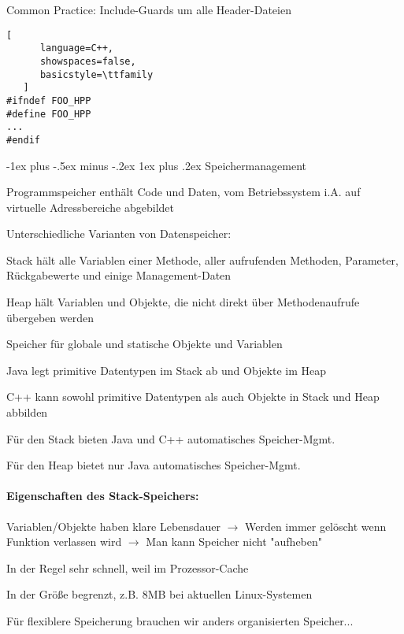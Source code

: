 \documentclass[10pt]{article}
\makeatletter
\renewcommand{\subsubsection}{\@startsection{subsubsection}{3}{0mm}%
                                {-1ex plus -.5ex minus -.2ex}%
                                {1ex plus .2ex}%
                                {\normalfont\small\bfseries}}
\makeatother
\begin{document}
\begin{itemize*}
Common Practice: Include-Guards um alle Header-Dateien
\begin{lstlisting}[
      language=C++,
      showspaces=false,
      basicstyle=\ttfamily
   ]
#ifndef FOO_HPP
#define FOO_HPP
...
#endif
\end{lstlisting}


\subsubsection{Speichermanagement}

\begin{itemize*}
  \item Programmspeicher enthält Code und Daten, vom Betriebssystem i.A. auf virtuelle Adressbereiche abgebildet
  \item Unterschiedliche Varianten von Datenspeicher:
  \begin{itemize*}
    \item Stack hält alle Variablen einer Methode, aller aufrufenden Methoden, Parameter, Rückgabewerte und einige Management-Daten
    \item Heap hält Variablen und Objekte, die nicht direkt über Methodenaufrufe übergeben werden
    \item Speicher für globale und statische Objekte und Variablen
  \end{itemize*}
  \item Java legt primitive Datentypen im Stack ab und Objekte im Heap
  \item C++ kann sowohl primitive Datentypen als auch Objekte in Stack und Heap abbilden
  \item Für den Stack bieten Java und C++ automatisches Speicher-Mgmt.
  \item Für den Heap bietet nur Java automatisches Speicher-Mgmt.
\end{itemize*}

\paragraph{Eigenschaften des Stack-Speichers:}
\begin{itemize*}
  \item Variablen/Objekte haben klare Lebensdauer $\rightarrow$ Werden immer gelöscht wenn Funktion verlassen wird  $\rightarrow$ Man kann Speicher nicht "aufheben"
  \item In der Regel sehr schnell, weil im Prozessor-Cache
  \item In der Größe begrenzt, z.B. 8MB bei aktuellen Linux-Systemen
  \item Für flexiblere Speicherung brauchen wir anders organisierten Speicher...
\end{itemize*}


\end{itemize*}
\end{document}
